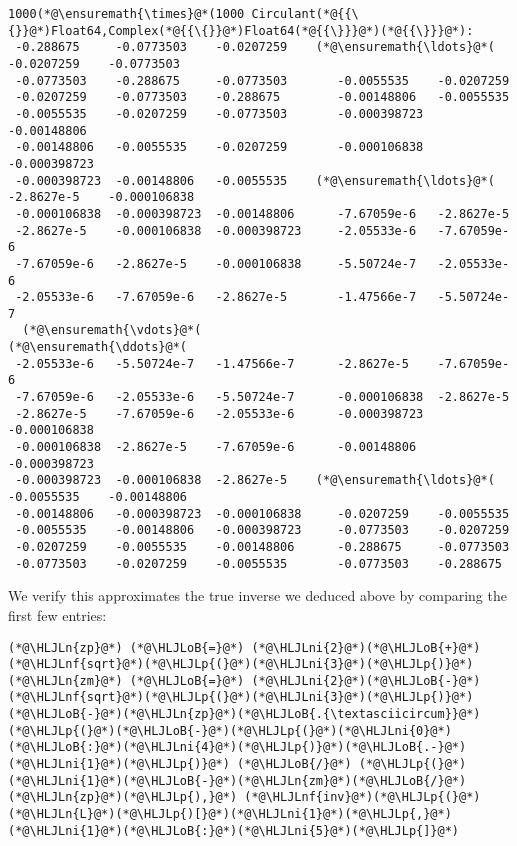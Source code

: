 \documentclass[12pt,landscape]{article}
\newcommand{\HLJLn}[1]{#1}
\newcommand{\HLJLnf}[1]{\textcolor[RGB]{66,102,213}{#1}}
\newcommand{\HLJLni}[1]{\textcolor[RGB]{59,151,46}{#1}}
\newcommand{\HLJLoB}[1]{\textcolor[RGB]{102,102,102}{\textbf{#1}}}
\newcommand{\HLJLp}[1]{#1}
\begin{document}
{\begin{lstlisting}
1000(*@\ensuremath{\times}@*(1000 Circulant(*@{{\{}}@*)Float64,Complex(*@{{\{}}@*)Float64(*@{{\}}}@*)(*@{{\}}}@*):
 -0.288675     -0.0773503    -0.0207259    (*@\ensuremath{\ldots}@*(  -0.0207259    -0.0773503
 -0.0773503    -0.288675     -0.0773503       -0.0055535    -0.0207259
 -0.0207259    -0.0773503    -0.288675        -0.00148806   -0.0055535
 -0.0055535    -0.0207259    -0.0773503       -0.000398723  -0.00148806
 -0.00148806   -0.0055535    -0.0207259       -0.000106838  -0.000398723
 -0.000398723  -0.00148806   -0.0055535    (*@\ensuremath{\ldots}@*(  -2.8627e-5    -0.000106838
 -0.000106838  -0.000398723  -0.00148806      -7.67059e-6   -2.8627e-5
 -2.8627e-5    -0.000106838  -0.000398723     -2.05533e-6   -7.67059e-6
 -7.67059e-6   -2.8627e-5    -0.000106838     -5.50724e-7   -2.05533e-6
 -2.05533e-6   -7.67059e-6   -2.8627e-5       -1.47566e-7   -5.50724e-7
  (*@\ensuremath{\vdots}@*(                                        (*@\ensuremath{\ddots}@*(                
 -2.05533e-6   -5.50724e-7   -1.47566e-7      -2.8627e-5    -7.67059e-6
 -7.67059e-6   -2.05533e-6   -5.50724e-7      -0.000106838  -2.8627e-5
 -2.8627e-5    -7.67059e-6   -2.05533e-6      -0.000398723  -0.000106838
 -0.000106838  -2.8627e-5    -7.67059e-6      -0.00148806   -0.000398723
 -0.000398723  -0.000106838  -2.8627e-5    (*@\ensuremath{\ldots}@*(  -0.0055535    -0.00148806
 -0.00148806   -0.000398723  -0.000106838     -0.0207259    -0.0055535
 -0.0055535    -0.00148806   -0.000398723     -0.0773503    -0.0207259
 -0.0207259    -0.0055535    -0.00148806      -0.288675     -0.0773503
 -0.0773503    -0.0207259    -0.0055535       -0.0773503    -0.288675
\end{lstlisting}


We verify this approximates the true inverse we deduced above by comparing the first few entries:


\begin{lstlisting}
(*@\HLJLn{zp}@*) (*@\HLJLoB{=}@*) (*@\HLJLni{2}@*)(*@\HLJLoB{+}@*)(*@\HLJLnf{sqrt}@*)(*@\HLJLp{(}@*)(*@\HLJLni{3}@*)(*@\HLJLp{)}@*)
(*@\HLJLn{zm}@*) (*@\HLJLoB{=}@*) (*@\HLJLni{2}@*)(*@\HLJLoB{-}@*)(*@\HLJLnf{sqrt}@*)(*@\HLJLp{(}@*)(*@\HLJLni{3}@*)(*@\HLJLp{)}@*)
(*@\HLJLoB{-}@*)(*@\HLJLn{zp}@*)(*@\HLJLoB{.{\textasciicircum}}@*)(*@\HLJLp{(}@*)(*@\HLJLoB{-}@*)(*@\HLJLp{(}@*)(*@\HLJLni{0}@*)(*@\HLJLoB{:}@*)(*@\HLJLni{4}@*)(*@\HLJLp{)}@*)(*@\HLJLoB{.-}@*)(*@\HLJLni{1}@*)(*@\HLJLp{)}@*) (*@\HLJLoB{/}@*) (*@\HLJLp{(}@*)(*@\HLJLni{1}@*)(*@\HLJLoB{-}@*)(*@\HLJLn{zm}@*)(*@\HLJLoB{/}@*)(*@\HLJLn{zp}@*)(*@\HLJLp{),}@*) (*@\HLJLnf{inv}@*)(*@\HLJLp{(}@*)(*@\HLJLn{L}@*)(*@\HLJLp{)[}@*)(*@\HLJLni{1}@*)(*@\HLJLp{,}@*)(*@\HLJLni{1}@*)(*@\HLJLoB{:}@*)(*@\HLJLni{5}@*)(*@\HLJLp{]}@*)
\end{lstlisting}

}
\end{document}
